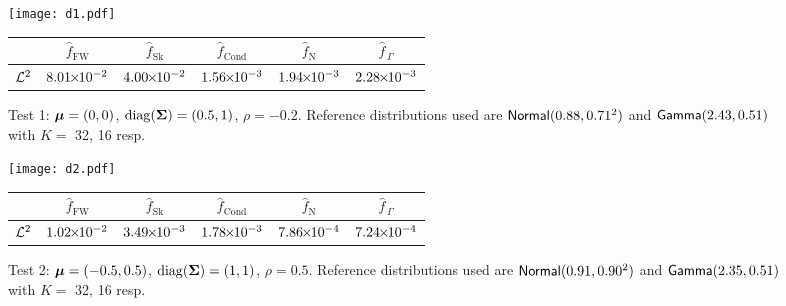 \begin{figure}[H]
\centering
\texttt{[image: d1.pdf]}

\vspace{4mm}

\begin{tabular}{c|c|c|c|c|c|}
\cline{2-6}
                         & $\widehat{f}_{\mathrm{FW}}$  & $\widehat{f}_{\mathrm{Sk}}$ & $\widehat{f}_{\mathrm{Cond}}$ & $\widehat{f}_{\mathrm{N}}$  & $\widehat{f}_{\,\Gamma}$ \\ \hline
\multicolumn{1}{|c|}{$\mathcal{L}^2$} & $8.01 {\mkern-2mu\times\mkern-2mu} 10^{-2}$ & $4.00 {\mkern-2mu\times\mkern-2mu} 10^{-2}$ & $1.56 {\mkern-2mu\times\mkern-2mu} 10^{-3}$ & $1.94 {\mkern-2mu\times\mkern-2mu} 10^{-3}$ & $2.28 {\mkern-2mu\times\mkern-2mu} 10^{-3}$ \\  \hline
\end{tabular}
\caption*{Test 1: $\bm{\mu} = (0, 0)$, $\mathrm{diag}(\bm{\Sigma}) = (0.5, 1)$, $\rho = -0.2$. Reference distributions used are $\mathsf{Normal}(0.88,0.71^2)$ and $\mathsf{Gamma}(2.43,0.51)$ with $K =$ 32, 16 resp.}
\end{figure}




\begin{figure}[H]
\centering
\texttt{[image: d2.pdf]}

\vspace{4mm}

\begin{tabular}{c|c|c|c|c|c|}
\cline{2-6}
                         & $\widehat{f}_{\mathrm{FW}}$  & $\widehat{f}_{\mathrm{Sk}}$ & $\widehat{f}_{\mathrm{Cond}}$ & $\widehat{f}_{\mathrm{N}}$  & $\widehat{f}_{\,\Gamma}$ \\ \hline
\multicolumn{1}{|c|}{$\mathcal{L}^2$} & $1.02 {\mkern-2mu\times\mkern-2mu} 10^{-2}$ & $3.49 {\mkern-2mu\times\mkern-2mu} 10^{-3}$ & $1.78 {\mkern-2mu\times\mkern-2mu} 10^{-3}$ & $7.86 {\mkern-2mu\times\mkern-2mu} 10^{-4}$ & $7.24 {\mkern-2mu\times\mkern-2mu} 10^{-4}$ \\ \hline
\end{tabular}
\caption*{Test 2: $\bm{\mu} = (-0.5, 0.5)$, $\mathrm{diag}(\bm{\Sigma})= (1,1)$, $\rho = 0.5$. Reference distributions used are $\mathsf{Normal}(0.91,0.90^2)$ and $\mathsf{Gamma}(2.35,0.51)$ with $K =$ 32, 16 resp.}
\end{figure}



